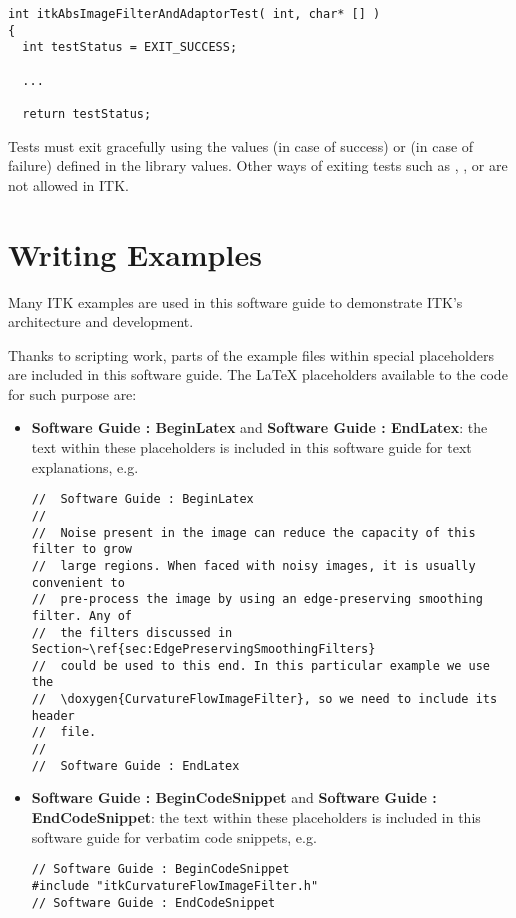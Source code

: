 \small
\begin{verbatim}
int itkAbsImageFilterAndAdaptorTest( int, char* [] )
{
  int testStatus = EXIT_SUCCESS;

  ...

  return testStatus;
\end{verbatim}
\normalsize

Tests must exit gracefully using the values  (in case of
success) or  (in case of failure) defined in the
 library values. Other ways of exiting tests such as
, , or  are not
allowed in ITK.


\section{Writing Examples}
\label{sec:WritingExamples}

Many ITK examples are used in this software guide to demonstrate ITK's
architecture and development.

Thanks to scripting work, parts of the  example files within
special placeholders are included in this software guide. The \LaTeX
placeholders available to the code for such purpose are:

\begin{itemize}
\item \textbf{Software Guide : BeginLatex} and
\textbf{Software Guide : EndLatex}: the text within these placeholders is
included in this software guide for text explanations, e.g.

\small
\begin{verbatim}
//  Software Guide : BeginLatex
//
//  Noise present in the image can reduce the capacity of this filter to grow
//  large regions. When faced with noisy images, it is usually convenient to
//  pre-process the image by using an edge-preserving smoothing filter. Any of
//  the filters discussed in Section~\ref{sec:EdgePreservingSmoothingFilters}
//  could be used to this end. In this particular example we use the
//  \doxygen{CurvatureFlowImageFilter}, so we need to include its header
//  file.
//
//  Software Guide : EndLatex
\end{verbatim}
\normalsize

\item \textbf{Software Guide : BeginCodeSnippet} and
\textbf{Software Guide : EndCodeSnippet}: the text within these placeholders is
included in this software guide for verbatim code snippets, e.g.

\small
\begin{verbatim}
// Software Guide : BeginCodeSnippet
#include "itkCurvatureFlowImageFilter.h"
// Software Guide : EndCodeSnippet
\end{verbatim}
\normalsize

\end{itemize}

